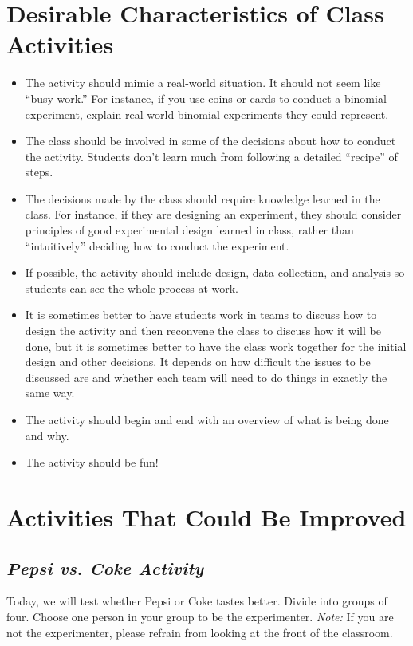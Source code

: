 \documentclass[twoside,openany]{tufte-book}
\begin{document}
\section{\textbf{Desirable Characteristics of Class Activities}}
\begin{itemize}[leftmargin=1cm, itemsep=.2em]
\item The activity should mimic a real-world situation. It should not seem like ``busy work.'' For instance, if you use coins or cards to conduct a binomial experiment, explain real-world binomial experiments they could represent. 
\item The class should be involved in some of the decisions about how to conduct the activity. Students don't learn much from following a detailed ``recipe'' of steps.
\item The decisions made by the class should require knowledge learned in the class. For instance, if they are designing an experiment, they should consider principles of good experimental design learned in class, rather than ``intuitively'' deciding how to conduct the experiment.
\item If possible, the activity should include design, data collection, and analysis so students can see the whole process at work. 
\item It is sometimes better to have students work in teams to discuss how to design the activity and then reconvene the class to discuss how it will be done, but it is sometimes better to have the class work together for the initial design and other decisions. It depends on how difficult the issues to be discussed are and whether each team will need to do things in exactly the same way.
\item The activity should begin and end with an overview of what is being done and why.
\item The activity should be fun!
\end{itemize}
\pagebreak

\section{\textbf{Activities That Could Be Improved}}

\subsection{\textbf{\textit{Pepsi vs. Coke Activity}}}
Today, we will test whether Pepsi or Coke tastes better.  Divide into groups of four. Choose one person in your group to be the experimenter. \textit{Note:} If you are not the experimenter, please refrain from looking at the front of the classroom.
 
\end{document}

